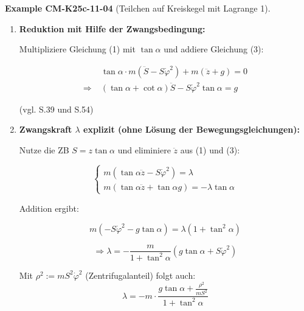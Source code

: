 \documentclass[10pt, letterpaper]{article}
\newcommand{\CustomHeading}[3]{%
  \par\medskip\noindent%
  \textbf{#1 #2} \textnormal{(#3)}.\enskip%
}
\newenvironment{EXA}[2]{\CustomHeading{Example}{#1}{#2}}{}
\begin{document}
\begin{EXA}{CM-K25c-11-04}{Teilchen auf Kreiskegel mit Lagrange 1}
\begin{enumerate}[label=\textbf{\arabic*)}, itemsep=1.5em]
\item \textbf{Reduktion mit Hilfe der Zwangsbedingung:}

Multipliziere Gleichung (1) mit \( \tan\alpha \) und addiere Gleichung (3):

\begin{align*}
&\tan\alpha \cdot m(\ddot{S} - S \dot{\varphi}^2) + m(\ddot{z} + g) = 0 \\
\Rightarrow \; & (\tan\alpha + \cot\alpha) \ddot{S} - S \dot{\varphi}^2 \tan\alpha = g
\end{align*}

(vgl. S.39 und S.54)

\item \textbf{Zwangskraft \(\lambda\) explizit (ohne Lösung der Bewegungsgleichungen):}

Nutze die ZB \( S = z \tan\alpha \) und eliminiere \( \ddot{z} \) aus (1) und (3):

\[
\begin{cases}
m(\tan\alpha \ddot{z} - S \dot{\varphi}^2) = \lambda \\
m(\tan\alpha \ddot{z} + \tan\alpha g) = -\lambda \tan\alpha
\end{cases}
\]

Addition ergibt:

\[
m(-S \dot{\varphi}^2 - g \tan\alpha) = \lambda (1 + \tan^2\alpha)
\]

\[
\Rightarrow \lambda = -\frac{m}{1 + \tan^2\alpha} \left( g \tan\alpha + S \dot{\varphi}^2 \right)
\]

Mit \( \rho^2 := m S^2 \dot{\varphi}^2 \) (Zentrifugalanteil) folgt auch:
\[
\lambda = -m \cdot \frac{g \tan\alpha + \frac{\rho^2}{m S^2}}{1 + \tan^2\alpha}
\]

\end{enumerate}
\end{EXA}
\end{document}
